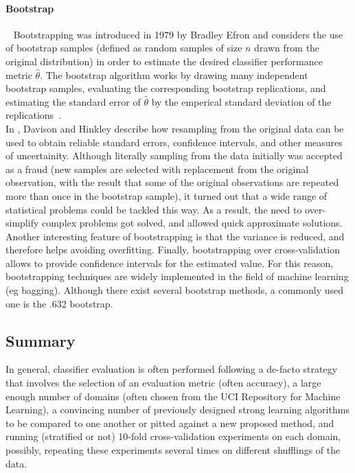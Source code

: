 \paragraph{Bootstrap}~\label{evaluation-bootstrap}
Bootstrapping was introduced in 1979 by Bradley Efron and considers the use of bootstrap samples (defined as random samples of size \(n\) drawn from the original distribution) in order to estimate the desired classifier performance metric \(\widehat{\theta}\). The bootstrap algorithm works by drawing many independent bootstrap samples, evaluating the corresponding bootstrap replications, and estimating the standard error of \(\widehat{\theta}\) by the emperical standard deviation of the replications~\cite{Cheung01Adv}.\\In \cite{BootstrapMethods97}, Davison and Hinkley describe how resampling from the original data can be used to obtain reliable standard errors, confidence intervals, and other measures of uncertainity. Although literally sampling from the data initially was accepted as a fraud (new samples are selected with replacement from the original observation, with the result that some of the original observations are repeated more than once in the bootstrap sample), it turned out that a wide range of statistical problems could be tackled this way. As a result, the need to over-simplify complex problems got solved, and allowed quick approximate solutions. Another interesting feature of bootstrapping is that the variance is reduced, and therefore helps avoiding overfitting. Finally, bootstrapping over cross-validation allows to provide confidence intervals for the estimated value. For this reason, bootstrapping techniques are widely implemented in the field of machine learning (eg bagging). Although there exist several bootstrap methods, a commonly used one is the .632 bootstrap.~\cite{Jiawei06}

\subsection{Summary}
In general, classifier evaluation is often performed following a de-facto strategy that involves the selection of an evaluation metric (often accuracy), a large enough number of domains (often chosen from the UCI Repository for Machine Learning), a convincing number of previously designed strong learning algorithms to be compared to one another or pitted against a new proposed method, and running (stratified or not) 10-fold cross-validation experiments on each domain, possibly, repeating these experiments several times on different shufflings of the data.\\

